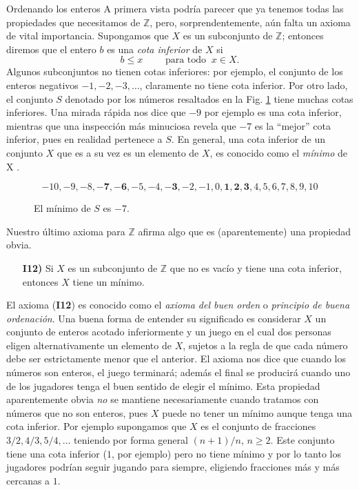 \begin{section}{Ordenando los enteros}
A primera vista podría parecer que ya tenemos todas las
propiedades que necesitamos de $\mathbb Z$, pero, sorprendentemente, aún falta un axioma de vital importancia.
Supongamos que $X$ es un subconjunto de $\mathbb Z$; entonces
diremos que el entero $b$ es una {\em cota inferior} de $X$ si
$$
b\le x \qquad \text{ para todo } \ x \in X.
$$
Algunos subconjuntos no tienen cotas inferiores: por ejemplo, el
conjunto de los enteros negativos $-1, -2, -3, \ldots$, claramente no
tiene cota inferior. Por otro lado, el conjunto $S$ denotado por
los números resaltados en la Fig. \ref{f1.1} tiene muchas cotas
inferiores. Una mirada rápida nos dice que $-9$ por ejemplo es una
cota inferior, mientras que una inspección más minuciosa revela
que $-7$ es la ``mejor'' cota inferior, pues en realidad pertenece
a $S$. En general, una cota inferior de un conjunto $X$ que es a
su vez es un elemento de $X$, es conocido como el {\em mínimo} de
X .



\begin{figure}[ht]
$$
-10, -9, -8, \mathbf{-7}, \mathbf{-6}, -5, -4, \mathbf{-3}, -2, -1, 0, \mathbf{1}, \mathbf{2}, \mathbf{3}, 
4, 5, 6, 7, 8, 9, 10
$$
\caption{El mínimo de $S$ es $-7$.}\label{f1.1}
\end{figure}


Nuestro último axioma para $\mathbb Z$ afirma algo que es
(aparentemente) una propiedad obvia.

\begin{enumerate}
\item[{\bf I12)}] Si $X$ es un subconjunto de $\mathbb Z$ que no es
vacío y tiene una cota inferior, entonces $X$ tiene un mínimo.
\end{enumerate}

El axioma ({\bf I12}) es conocido como el {\em axioma del buen orden} o {\em principio de buena ordenación}. 
Una buena forma de entender su significado es considerar $X$ un conjunto de enteros acotado inferiormente  y un juego en el cual dos personas eligen alternativamente un
elemento de $X$, sujetos a la regla de que cada número debe ser
estrictamente menor que el anterior. El axioma nos dice que cuando
los números son enteros, el juego terminará; además el final se
producirá cuando uno de los jugadores tenga el buen sentido de
elegir el mínimo. Esta propiedad aparentemente obvia {\it no} se
mantiene necesariamente cuando tratamos con números que no son
enteros, pues $X$ puede no tener un mínimo aunque tenga una cota
inferior. Por ejemplo supongamos que $X$ es el conjunto de
fracciones $3/2, 4/3, 5/4, \ldots$ teniendo por forma general
$(n+1)/n$, $n\ge 2$. Este conjunto tiene una cota inferior ($1$, por
ejemplo) pero no tiene mínimo y por lo tanto los jugadores podrían
seguir jugando para siempre, eligiendo fracciones más y más
cercanas a $1$.


\end{section}
